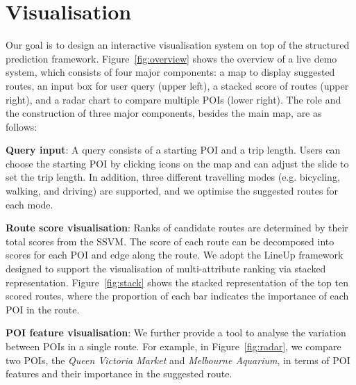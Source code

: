 \section{Visualisation}
Our goal is to design an interactive visualisation system on top of the structured prediction framework.
Figure~\ref{fig:overview} shows the overview of a live demo system, which consists of four major components: a map to display suggested routes, an input box for user query (upper left), a stacked score of routes (upper right), and a radar chart to compare multiple POIs (lower right). 
The role and the construction of three major components, besides the main map, are as follows:

\textbf{Query input}: A query consists of a starting POI and a trip length. 
Users can choose the starting POI by clicking icons on the map and can adjust the slide to set the trip length. 
In addition, three different travelling modes (e.g. bicycling, walking, and driving) are supported, 
and we optimise the suggested routes for each mode.

\textbf{Route score visualisation}: Ranks of candidate routes are determined by their total scores from the SSVM. 
The score of each route can be decomposed into scores for each POI and edge along the route. 
We adopt the LineUp framework~\cite{gratzl2013lineup} designed to support the visualisation of multi-attribute ranking via stacked representation. 
Figure~\ref{fig:stack} shows the stacked representation of the top ten scored routes, where the proportion of each bar indicates the importance of each POI in the route.

\textbf{POI feature visualisation}: We further provide a tool to analyse the variation between POIs in a single route. 
        For example, in Figure~\ref{fig:radar}, we compare two POIs, the \textit{Queen Victoria Market} and \textit{Melbourne Aquarium}, in terms of POI features and their importance in the suggested route. 

